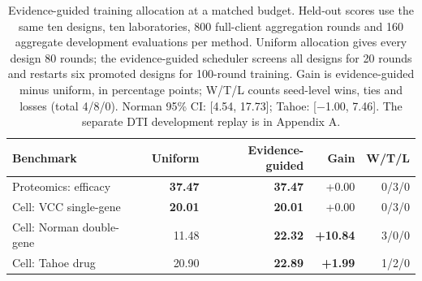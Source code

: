 \begin{table}[t]
\caption{Evidence-guided training allocation at a matched budget. Held-out scores use the same ten designs, ten laboratories, 800 full-client aggregation rounds and 160 aggregate development evaluations per method. Uniform allocation gives every design 80 rounds; the evidence-guided scheduler screens all designs for 20 rounds and restarts six promoted designs for 100-round training. Gain is evidence-guided minus uniform, in percentage points; W/T/L counts seed-level wins, ties and losses (total 4/8/0). Norman 95\% CI: [4.54, 17.73]; Tahoe: [$-$1.00, 7.46]. The separate DTI development replay is in Appendix A.}
\label{tab:strong-effects}
\centering\small
\setlength{\tabcolsep}{4.5pt}
\renewcommand{\arraystretch}{1.08}
\begin{tabularx}{\linewidth}{@{}Xrrrr@{}}
\toprule
\textbf{Benchmark} & \textbf{Uniform} & \textbf{Evidence-guided} & \textbf{Gain} & \textbf{W/T/L} \\
\midrule
Proteomics: efficacy & \textbf{37.47} & \textbf{37.47} & +0.00 & 0/3/0 \\
Cell: VCC single-gene & \textbf{20.01} & \textbf{20.01} & +0.00 & 0/3/0 \\
Cell: Norman double-gene & 11.48 & \textbf{22.32} & \textbf{+10.84} & 3/0/0 \\
Cell: Tahoe drug & 20.90 & \textbf{22.89} & \textbf{+1.99} & 1/2/0 \\
\bottomrule
\end{tabularx}
\end{table}
